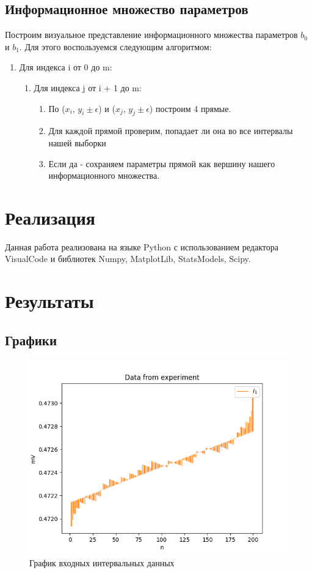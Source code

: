 \documentclass[a4paper,12pt]{article}
\begin{document}
\subsection{Информационное множество параметров}
Построим визуальное представление информационного множества параметров $b_0$ и $b_1$. Для этого воспользуемся следующим алгоритмом:
\begin{enumerate}
    \item Для индекса i от 0 до m:
        \begin{enumerate}
            \item  Для индекса j от i + 1 до m:
                \begin{enumerate}
                    \item  По ($x_i$, $y_i \pm \epsilon$) и ($x_j$, $y_j \pm \epsilon$) построим 4 прямые.
                    \item Для каждой прямой проверим, попадает ли она во все интервалы нашей выборки
                    \item Если да - сохраняем параметры прямой как вершину нашего информационного множества.
                \end{enumerate}    
        \end{enumerate}
\end{enumerate}
\section{Реализация}
Данная работа реализована на языке Python с использованием редактора VisualCode и библиотек Numpy, MatplotLib, StatsModels, Scipy. 
\section{Результаты}
\subsection{Графики}
\begin{figure}[H]
    \centering
    \includegraphics[width=15cm]{pics/input.png}
    \caption{График входных интервальных данных}
    \label{fig:input}
\end{figure}
\end{document}
